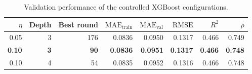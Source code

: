 \begin{table}[!htbp]
\centering
\footnotesize
\setlength{\tabcolsep}{3.5pt}
\caption{Validation performance of the controlled XGBoost configurations.}
\label{tab:xgboost-tuning-comparison}
\begin{tabular}{rrrrrrrr}
\toprule
$\eta$ & Depth & Best round & $\mathrm{MAE}_{\mathrm{train}}$ & $\mathrm{MAE}_{\mathrm{val}}$ & $\mathrm{RMSE}$ & $R^2$ & $\overline{\rho}$ \\
\midrule
0.05 & 3 & 176 & 0.0836 & 0.0950 & 0.1317 & 0.466 & 0.749 \\
\textbf{0.10} & \textbf{3} & \textbf{90} & \textbf{0.0836} & \textbf{0.0951} & \textbf{0.1317} & \textbf{0.466} & \textbf{0.748} \\
0.10 & 4 & 54 & 0.0835 & 0.0952 & 0.1316 & 0.466 & 0.748 \\
\bottomrule
\end{tabular}
\end{table}
